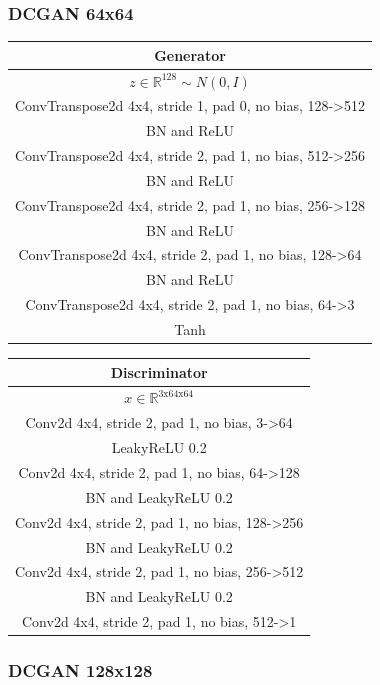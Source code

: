 \documentclass{article}
\begin{document}
\subsubsection{DCGAN 64x64}

\begin{tabular}{c}
	Generator \\
	\toprule\midrule
	$z \in \mathbb{R}^{128} \sim N(0,I)$ \\
	\midrule
	ConvTranspose2d 4x4, stride 1, pad 0, no bias, 128->512 \\
	\midrule
	BN and ReLU \\
	\midrule
	ConvTranspose2d 4x4, stride 2, pad 1, no bias, 512->256 \\
	\midrule
	BN and ReLU \\
	\midrule
	ConvTranspose2d 4x4, stride 2, pad 1, no bias, 256->128 \\
	\midrule
	BN and ReLU \\
	\midrule
	ConvTranspose2d 4x4, stride 2, pad 1, no bias, 128->64 \\
	\midrule
	BN and ReLU \\
	\midrule
	ConvTranspose2d 4x4, stride 2, pad 1, no bias, 64->3 \\
	\midrule
	Tanh \\
	\bottomrule
\end{tabular} 
\quad
\begin{tabular}{c}
	Discriminator \\
	\toprule\midrule
	$x \in \mathbb{R}^{\text{3x64x64}}$ \\
	\midrule
	Conv2d 4x4, stride 2, pad 1, no bias, 3->64 \\
	\midrule
	LeakyReLU 0.2 \\
	\midrule
	Conv2d 4x4, stride 2, pad 1, no bias, 64->128 \\
	\midrule
	BN and LeakyReLU 0.2 \\
	\midrule
	Conv2d 4x4, stride 2, pad 1, no bias, 128->256 \\
	\midrule
	BN and LeakyReLU 0.2 \\
	\midrule
	Conv2d 4x4, stride 2, pad 1, no bias, 256->512 \\
	\midrule
	BN and LeakyReLU 0.2 \\
	\midrule
	Conv2d 4x4, stride 2, pad 1, no bias, 512->1 \\
	\bottomrule
\end{tabular}

\subsubsection{DCGAN 128x128}
\end{document}
